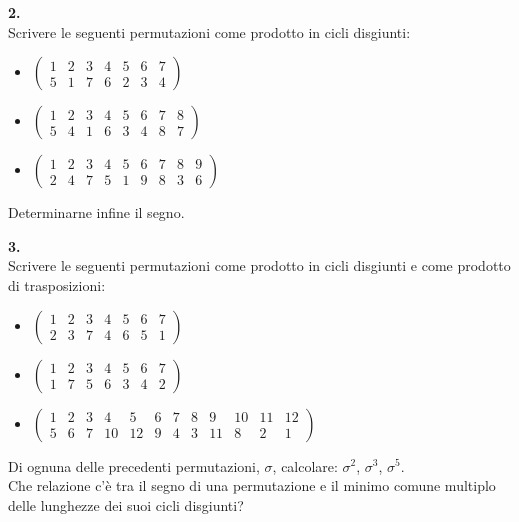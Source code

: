 \documentclass[italian,a4paper,11pt]
{article}
\begin{document}
\vspace{0.4cm}
\noindent
\begin{Ex}\textbf{ 2.}\\
Scrivere le seguenti permutazioni come prodotto in cicli disgiunti:
\begin{itemize}
	\item $\left(\begin{matrix} 1 & 2 & 3 & 4 & 5 & 6 & 7 \\ 5 & 1 & 7 & 6 & 2 & 3 & 4 \end{matrix} \right )$
	\item $\left(\begin{matrix} 1 & 2 & 3 & 4 & 5 & 6 & 7 & 8 \\ 5 & 4 & 1 & 6 & 3 & 4 & 8 & 7 \end{matrix} \right )$
	\item $\left(\begin{matrix} 1 & 2 & 3 & 4 & 5 & 6 & 7 & 8 & 9 \\ 2 & 4 & 7 & 5 & 1 & 9 & 8 & 3 & 6 \end{matrix} \right )$
\end{itemize}
Determinarne infine il segno.
\end{Ex}

\vspace{0.4cm}
\noindent
\begin{Ex}\textbf{ 3.}\\
Scrivere le seguenti permutazioni come prodotto in cicli disgiunti e come prodotto di trasposizioni:
\begin{itemize}
\item $\left(\begin{matrix} 1 & 2 & 3 & 4 & 5 & 6 & 7 \\ 2 & 3 & 7 & 4 & 6 & 5 & 1 \end{matrix} \right )$
\item $\left(\begin{matrix} 1 & 2 & 3 & 4 & 5 & 6 & 7 \\ 1 & 7 & 5 & 6 & 3 & 4 & 2 \end{matrix} \right )$
\item $\left(\begin{array}{cccccccccccc} 1 & 2 & 3 & 4 & 5 & 6 & 7 & 8 & 9 & 10 & 11 & 12 \\ 5 & 6 & 7 & 10 & 12 & 9 & 4 & 3 & 11 & 8 & {2} & {1} \end{array} \right )$
\end{itemize}
Di ognuna delle precedenti permutazioni, $\sigma$, calcolare: $\sigma^2$, $\sigma^3$, $\sigma^5$.\\
Che relazione c'\`e tra il segno di una permutazione e il minimo comune multiplo delle lunghezze dei suoi cicli disgiunti?
\end{Ex}
\end{document}
